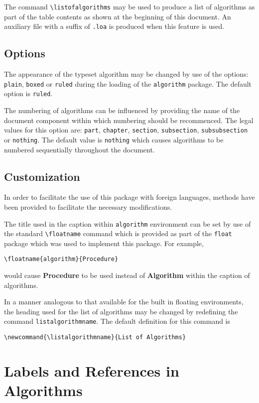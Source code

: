 \documentclass{article}
\begin{document}
The command \verb+\listofalgorithms+ may be used to produce a list
of algorithms as part of the table contents as shown at the beginning of
this document.
An auxiliary file with a suffix of \texttt{.loa} is produced when this
feature is used.

\subsection{Options}

The appearance of the typeset algorithm may be changed by use of the
options: \texttt{plain}, \texttt{boxed} or \texttt{ruled} during the
loading of the \texttt{algorithm} package.
The default option is \texttt{ruled}.

The numbering of algorithms can be influenced by providing the name of
the document component within which numbering should be recommenced.
The legal values for this option are: \texttt{part}, \texttt{chapter},
\texttt{section}, \texttt{subsection}, \texttt{subsubsection}
or \texttt{nothing}.
The default value is \texttt{nothing} which causes algorithms to be
numbered sequentially throughout the document.

\subsection{Customization}

In order to facilitate the use of this package with foreign languages,
methods have been provided to facilitate the necessary modifications.

The title used in the caption within \texttt{algorithm} environment
can be set by use of the standard \verb+\floatname+ command which is
provided as part of the \texttt{float} package which was used to
implement this package.
For example,
\begin{verbatim}
\floatname{algorithm}{Procedure}
\end{verbatim}
would cause \textbf{Procedure} to be used instead of \textbf{Algorithm}
within the caption of algorithms.

In a manner analogous to that available for the built in floating
environments, the heading used for the list of algorithms may be changed
by redefining the command \verb+listalgorithmname+.
The default definition for this command is
\begin{verbatim}
\newcommand{\listalgorithmname}{List of Algorithms}
\end{verbatim}

\section{Labels and References in Algorithms}
\end{document}
